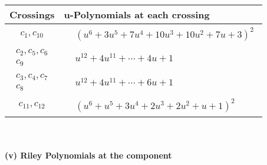 \documentclass[1p]{elsarticle_modified}
\theoremstyle{definition}
\begin{document}
\begin{tabular}{m{50pt}|m{274pt}}
Crossings & \hspace{64pt}u-Polynomials at each crossing \\
\hline $$\begin{aligned}c_{1},c_{10}\end{aligned}$$&$\begin{aligned}
&(u^6+3 u^5+7 u^4+10 u^3+10 u^2+7 u+3)^2
\end{aligned}$\\
\hline $$\begin{aligned}c_{2},c_{5},c_{6}\\c_{9}\end{aligned}$$&$\begin{aligned}
&u^{12}+4 u^{11}+\cdots+4 u+1
\end{aligned}$\\
\hline $$\begin{aligned}c_{3},c_{4},c_{7}\\c_{8}\end{aligned}$$&$\begin{aligned}
&u^{12}+4 u^{11}+\cdots+6 u+1
\end{aligned}$\\
\hline $$\begin{aligned}c_{11},c_{12}\end{aligned}$$&$\begin{aligned}
&(u^6+u^5+3 u^4+2 u^3+2 u^2+u+1)^2
\end{aligned}$\\
\hline
\end{tabular}\\~\\
\newpage\renewcommand{\arraystretch}{1}
\flushleft \textbf{(v) Riley Polynomials at the component}\newline \\
\end{document}
